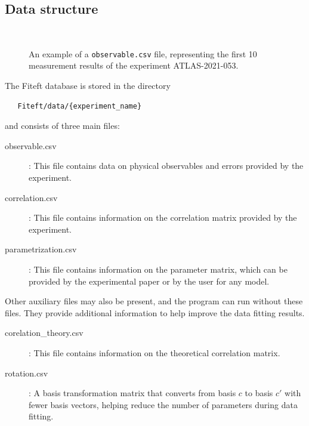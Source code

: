 \documentclass[12pt]{article}
\newlength{\mywidth}\setlength{\mywidth}{14.5cm}
\begin{document}
 \subsection{Data structure}
 \begin{figure}
   \resizebox{\textwidth}{!}{
     
     }\\
     \caption{An example of a \texttt{observable.csv} file, representing the first 10 measurement results of the experiment ATLAS-2021-053\cite{ATLAS:2021vrm}.}
 \end{figure}
 
 The Fiteft database is stored in the directory
 \begin{verbatim}
   Fiteft/data/{experiment_name}
 \end{verbatim}
 and consists of three main files:
 \begin{description}
   \item[observable.csv]: This file contains data on physical observables and errors provided by the experiment.
   \item[correlation.csv]: This file contains information on the correlation matrix provided by the experiment.
   \item[parametrization.csv]: This file contains information on the parameter matrix, which can be provided by the experimental paper or by the user for any model.
 \end{description}
 Other auxiliary files may also be present, and the program can run without these files. They provide additional information to help improve the data fitting results.
 \begin{description} 
   \item [corelation\_theory.csv]: This file contains information on the theoretical correlation matrix.
   \item [rotation.csv]: A basis transformation matrix that converts from basis $c$ to basis $c'$ with fewer basis vectors, helping reduce the number of parameters during data fitting.
 \end{description}
\end{document}
